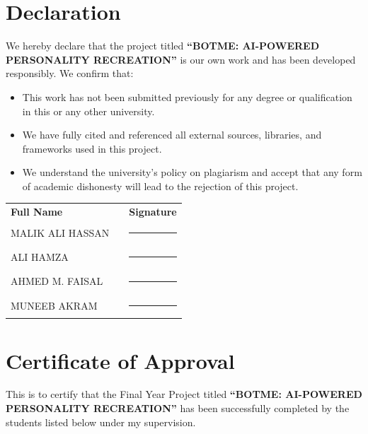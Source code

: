 \documentclass[12pt,a4paper]{report}
\begin{document}
\chapter*{Declaration}

We hereby declare that the project titled \textbf{“BOTME: AI-POWERED PERSONALITY RECREATION”} is our own work and has been developed responsibly. We confirm that:

\begin{itemize}
    \item This work has not been submitted previously for any degree or qualification in this or any other university.
    \item We have fully cited and referenced all external sources, libraries, and frameworks used in this project.
    \item We understand the university's policy on plagiarism and accept that any form of academic dishonesty will lead to the rejection of this project.
\end{itemize}

\vspace{2.5cm}

\begin{table}[h]
    \centering
    \begin{tabular}{p{6cm} p{1cm} p{6cm}}
        \textbf{Full Name} & & \textbf{Signature} \\[1.2cm]
        MALIK ALI HASSAN & & \rule{6cm}{0.4pt} \\[1.2cm]
        ALI HAMZA & & \rule{6cm}{0.4pt} \\[1.2cm]
        AHMED M. FAISAL & & \rule{6cm}{0.4pt} \\[1.2cm]
        MUNEEB AKRAM & & \rule{6cm}{0.4pt}
    \end{tabular}
\end{table}

\newpage

\chapter*{Certificate of Approval}

This is to certify that the Final Year Project titled \textbf{“BOTME: AI-POWERED PERSONALITY RECREATION”} has been successfully completed by the students listed below under my supervision. 
\end{document}
